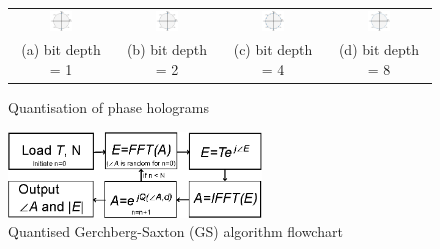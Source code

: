 	\begin{figure} [H]
		\begin{center}
			\begin{tabular}{c c c c}
				\includegraphics[width = 0.24\textwidth]{Quantization_bit_depth_1.jpg} & \includegraphics[width = 0.24\textwidth]{Quantization_bit_depth_2.jpg} & \includegraphics[width = 0.24\textwidth]{Quantization_bit_depth_4.jpg} & \includegraphics[width = 0.24\textwidth]{Quantization_bit_depth_8.jpg}\\
				(a) bit depth = 1 & (b) bit depth = 2 & (c) bit depth = 4 & (d) bit depth = 8
			\end{tabular}
			\caption{\label{fig:Quantisation_bit_depth} Quantisation of phase holograms}
		\end{center}
	\end{figure}

	\begin{figure} [H]
	   \begin{center}
	   \includegraphics[width = 0.6\textwidth]{GS_quantized_flowchart.eps}
	   \end{center}
	   \caption{\label{fig:GS_quantised_flowchart} Quantised Gerchberg-Saxton (GS) algorithm flowchart}
	\end{figure}

